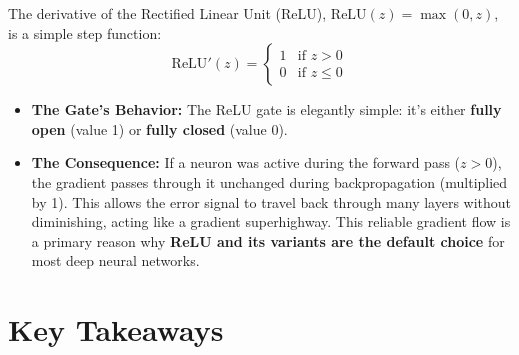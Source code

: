 \documentclass{article}
\begin{document}
\begin{tcolorbox}
The derivative of the Rectified Linear Unit (ReLU), $\text{ReLU}(z) = \max(0, z)$, is a simple step function:
\begin{equation}
    \text{ReLU}'(z) = \begin{cases}
        1 & \text{if } z > 0 \\
        0 & \text{if } z \leq 0
    \end{cases}
\end{equation}
\begin{itemize}
    \item \textbf{The Gate's Behavior:} The ReLU gate is elegantly simple: it's either \textbf{fully open} (value 1) or \textbf{fully closed} (value 0).
    \item \textbf{The Consequence:} If a neuron was active during the forward pass ($z>0$), the gradient passes through it unchanged during backpropagation (multiplied by 1). This allows the error signal to travel back through many layers without diminishing, acting like a gradient superhighway. This reliable gradient flow is a primary reason why \textbf{ReLU and its variants are the default choice} for most deep neural networks.
\end{itemize}

\end{tcolorbox}


\section{Key Takeaways}
\end{document}
